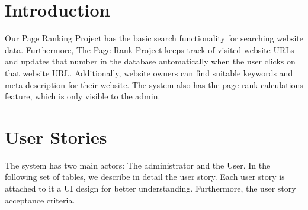 \documentclass{scrartcl}
\begin{document}
\section{Introduction}

Our Page Ranking Project has the basic search functionality for searching website data. Furthermore, The Page Rank Project keeps track of visited website URLs and updates that number in the database automatically when the user clicks on that website URL. Additionally, website owners can find suitable keywords and meta-description for their website. The system also has the page rank calculations feature, which is only visible to the admin.

\section{User Stories}

The system has two main actors: The administrator and the User.
In the following set of tables, we describe in detail the user story.
Each user story is attached to it a UI design for better understanding. Furthermore, the user story acceptance criteria.
\end{document}
